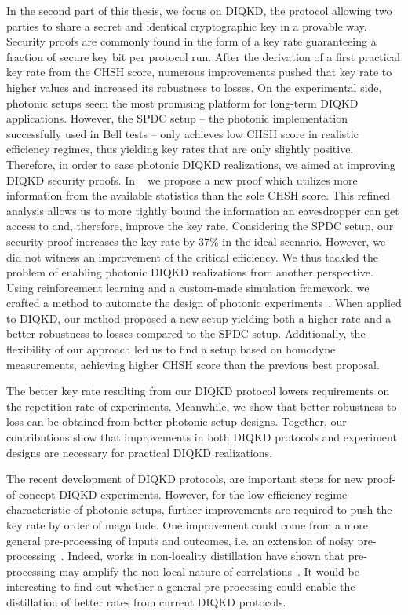 In the second part of this thesis, we focus on \acrfull{DIQKD}, the protocol allowing two parties to share a secret and identical cryptographic key in a provable way.
Security proofs are commonly found in the form of a key rate guaranteeing a fraction of secure key bit per protocol run.
After the derivation of a first practical key rate from the CHSH score, numerous improvements pushed that key rate to higher values and increased its robustness to losses.
On the experimental side, photonic setups seem the most promising platform for long-term DIQKD applications.
However, the SPDC setup -- the photonic implementation successfully used in Bell tests -- only achieves low CHSH score in realistic efficiency regimes, thus yielding key rates that are only slightly positive.
Therefore, in order to ease photonic DIQKD realizations, we aimed at improving DIQKD security proofs.
In ~\cite{Sekatski2021} we propose a new proof which utilizes more information from the available statistics than the sole CHSH score.
This refined analysis allows us to more tightly bound the information an eavesdropper can get access to and, therefore, improve the key rate.
Considering the SPDC setup, our security proof increases the key rate by $37\%$ in the ideal scenario.
However, we did not witness an improvement of the critical efficiency.
We thus tackled the problem of enabling photonic DIQKD realizations from another perspective.
Using reinforcement learning and a custom-made simulation framework, we crafted a method to automate the design of photonic experiments~\cite{Valcarce2022b}.
When applied to DIQKD, our method proposed a new setup yielding both a higher rate and a better robustness to losses compared to the SPDC setup.
Additionally, the flexibility of our approach led us to find a setup based on homodyne measurements, achieving higher CHSH score than the previous best proposal.

The better key rate resulting from our DIQKD protocol lowers requirements on the repetition rate of experiments.
Meanwhile, we show that better robustness to loss can be obtained from better photonic setup designs.
Together, our contributions show that improvements in both DIQKD protocols and experiment designs are necessary for practical DIQKD realizations.


\medbreak

The recent development of DIQKD protocols, are important steps for new proof-of-concept DIQKD experiments.
However, for the low efficiency regime characteristic of photonic setups, further improvements are required to push the key rate by order of magnitude.
One improvement could come from a more general pre-processing of inputs and outcomes, i.e. an extension of noisy pre-processing~\cite{Ho2020}.
Indeed, works in non-locality distillation have shown that pre-processing may amplify the non-local nature of correlations~\cite{Forster2009}.
It would be interesting to find out whether a general pre-processing could enable the distillation of better rates from current DIQKD protocols.

